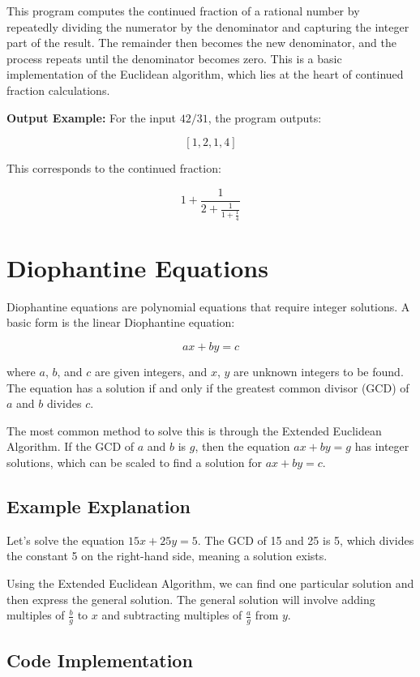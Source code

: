 \documentclass[10pt,a4paper]{article}
\begin{document}
This program computes the continued fraction of a rational number by repeatedly dividing the numerator by the denominator and capturing the integer part of the result. The remainder then becomes the new denominator, and the process repeats until the denominator becomes zero. This is a basic implementation of the Euclidean algorithm, which lies at the heart of continued fraction calculations.

\textbf{Output Example:}
For the input \(42/31\), the program outputs:

\[
[1, 2, 1, 4]
\]

This corresponds to the continued fraction:

\[
1 + \frac{1}{2 + \frac{1}{1 + \frac{1}{4}}}
\]



\section*{Diophantine Equations}

Diophantine equations are polynomial equations that require integer solutions. A basic form is the linear Diophantine equation:

\[
ax + by = c
\]

where \(a\), \(b\), and \(c\) are given integers, and \(x\), \(y\) are unknown integers to be found. The equation has a solution if and only if the greatest common divisor (GCD) of \(a\) and \(b\) divides \(c\).

The most common method to solve this is through the Extended Euclidean Algorithm. If the GCD of \(a\) and \(b\) is \(g\), then the equation \(ax + by = g\) has integer solutions, which can be scaled to find a solution for \(ax + by = c\).

\subsection*{Example Explanation}

Let’s solve the equation \(15x + 25y = 5\). The GCD of 15 and 25 is 5, which divides the constant 5 on the right-hand side, meaning a solution exists.

Using the Extended Euclidean Algorithm, we can find one particular solution and then express the general solution. The general solution will involve adding multiples of \(\frac{b}{g}\) to \(x\) and subtracting multiples of \(\frac{a}{g}\) from \(y\).

\subsection*{Code Implementation}
\end{document}
